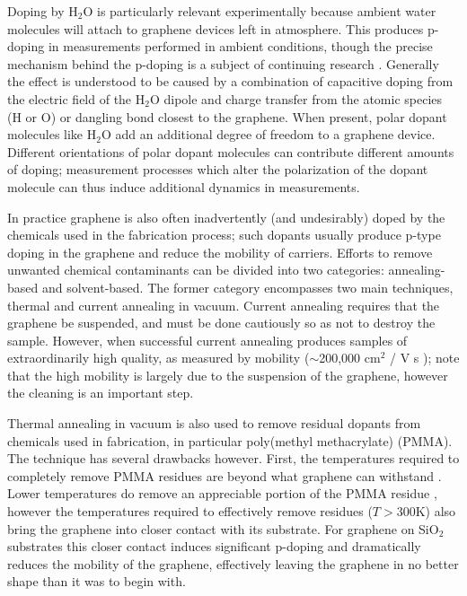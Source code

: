 \documentclass[edeposit,fullpage,draftthesis]{uiucthesis2009}
\begin{document}
        Doping by H$_2$O is particularly relevant experimentally because ambient water molecules
        will attach to graphene devices left in atmosphere. This produces p-doping in measurements
        performed in ambient conditions, though the precise mechanism behind the p-doping is
        a subject of continuing research 
        \cite{leenaerts2008adsorption, Moser2008, wang2010hysteresis, Wehling2008, Sabio2008}.
        Generally the effect is understood to be caused by a combination of capacitive doping
        from the electric field of the H$_2$O dipole and charge transfer from the atomic
        species (H or O) or dangling bond closest to the graphene.
        When present, polar dopant molecules like H$_2$O add an additional degree of freedom to a graphene device. 
        Different orientations of polar dopant molecules can contribute different amounts of doping;
        measurement processes which alter the polarization of the dopant molecule can thus induce
        additional dynamics in measurements.
        
        In practice graphene is also often inadvertently (and undesirably) doped by the chemicals
        used in the fabrication process; such dopants usually produce
        p-type doping in the graphene and reduce the mobility of carriers. 
        Efforts to remove unwanted chemical contaminants can be divided into two categories:
        annealing-based and solvent-based. The former category encompasses two main techniques,
        thermal \cite{pirkle2011effect, lin2011graphene} and current \cite{bolotin2008ultrahigh}
        annealing in vacuum. Current annealing requires that the graphene be suspended, and
        must be done cautiously so as not to destroy the sample. However, when successful current annealing produces
        samples of extraordinarily high quality, as measured by mobility ($\sim$200,000 cm$^2$ / V s \cite{bolotin2008ultrahigh});
        note that the high mobility is largely due to the suspension of the graphene, however the 
        cleaning is an important step.
        
        Thermal annealing in vacuum is also used to remove residual dopants from chemicals used in fabrication, in particular
        poly(methyl methacrylate) (PMMA). The technique has several drawbacks however. First, the temperatures
        required to completely remove PMMA residues are beyond what graphene can withstand \cite{lin2011graphene}.
        Lower temperatures do remove an appreciable portion of the PMMA residue \cite{pirkle2011effect}, 
        however the temperatures required to effectively remove residues ($T > 300$K) also bring the graphene
        into closer contact with its substrate. For graphene on SiO$_2$ substrates this closer contact induces
        significant p-doping and dramatically reduces the mobility of the graphene, effectively leaving
        the graphene in no better shape than it was to begin with.
        
\end{document}
